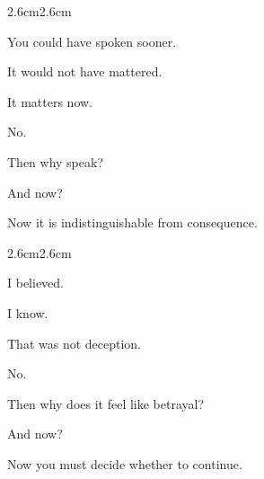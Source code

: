 \begin{adjustwidth}{2.6cm}{2.6cm}

 You could have spoken sooner.

 It would not have mattered.

 It matters now.

 No.

 Then why speak?

\vspace{1em}


\vspace{1em}

 And now?

 Now it is indistinguishable from consequence.

\vspace{2em}

\end{adjustwidth}

\begin{adjustwidth}{2.6cm}{2.6cm}

 I believed.

 I know.

 That was not deception.

 No.

 Then why does it feel like betrayal?

\vspace{1em}


\vspace{1em}

 And now?

 Now you must decide whether to continue.

\vspace{1em}



\vspace{2em}

\end{adjustwidth}

